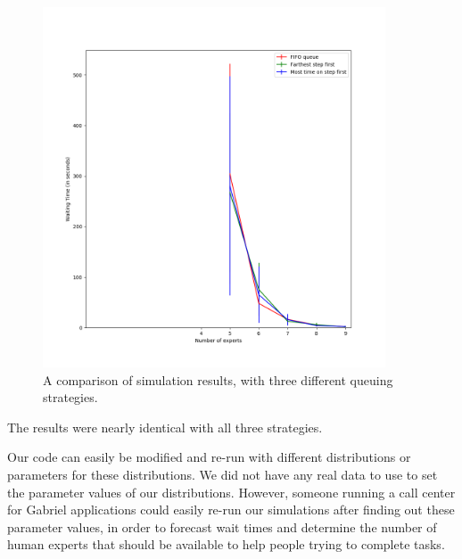 \begin{figure}[h]
  \includegraphics[width=4in]{figures/montecarlo/full_three_strategies.png}
  \caption{
    A comparison of simulation results, with three different queuing strategies.
  }\label{fig:full_three_strategies}
\end{figure}

The results were nearly identical with all three strategies.

Our code can easily be modified and re-run with different distributions or
parameters for these distributions.
We did not have any real data to use to set the parameter values of our
distributions.
However, someone running a call center for Gabriel applications could easily
re-run our simulations after finding out these parameter values, in order to
forecast wait times and determine the number of human experts that should be
available to help people trying to complete tasks.
